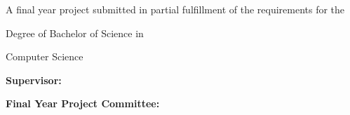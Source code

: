 \begin{titlepage}
  \thispagestyle{empty}
  \centering

  \TemplateLogo\par

  \vspace{37.5pt}
  {\fontsize{16}{19.2}\selectfont \ReportTitle\par}

  \vspace{68.4pt}
  {\fontsize{14}{16.2}\selectfont
    A final year project submitted in partial fulfillment of the requirements for the\par
    Degree of Bachelor of Science in\par
    Computer Science\par
  }

  \vspace{31.8pt}
  \TemplateStudentTable

  \vspace{47.4pt}
  {\fontsize{14}{16.8}\selectfont
    \textbf{Supervisor:}\par
    \ReportSupervisor\par
  }

  \vspace{42pt}
  {\fontsize{14}{16.8}\selectfont
    \textbf{Final Year Project Committee:}\par
    \ReportCommitteeMemberOne\par
    \ReportCommitteeMemberTwo\par
  }
\end{titlepage}
